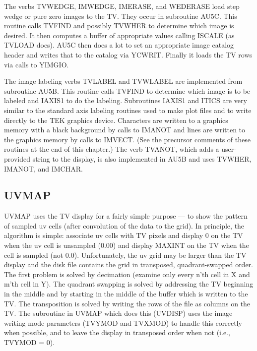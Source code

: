 The verbs TVWEDGE, IMWEDGE, IMERASE, and WEDERASE load step wedge or
pure zero images to the TV.  They occur in subroutine AU5C.  This
routine calls TVFIND and possibly TVWHER
to determine which image is
desired.  It then computes a buffer of appropriate values calling
ISCALE (as TVLOAD does).  AU5C then does a lot
to set an
appropriate image catalog header and writes that to the catalog via YCWRIT.
Finally it loads the TV rows via calls to YIMGIO.

The image labeling verbs TVLABEL and TVWLABEL are implemented from
subroutine AU5B.  This routine calls TVFIND to determine
which image is to be labeled and IAXIS1 to do the labeling.  Subroutines
IAXIS1 and ITICS are very similar to the
standard axis labeling routines
used to make plot files and to write directly to the TEK graphics
device. Characters are written to a graphics memory with a black
background by calls to IMANOT and lines are written to
the graphics memory by calls to IMVECT.  (See the precursor comments of
these routines at the end of this chapter.)  The verb TVANOT, which adds
a user-provided string to the display, is also implemented in
AU5B and uses TVWHER, IMANOT, and IMCHAR.

\subsection{UVMAP}
UVMAP uses the TV display for a fairly simple purpose --- to show the
pattern of sampled uv cells (after convolution of the data to the
grid).  In principle, the algorithm is simple: associate uv cells with
TV pixels and display 0 on the TV when the uv cell is unsampled (0.00)
and display MAXINT on the TV when the cell is sampled (not 0.0).
Unfortunately, the uv grid may be larger than the TV display and the
disk file contains the grid in transposed, quadrant-swapped order.
The first problem is solved by decimation (examine only every n'th
cell in X and m'th cell in Y).  The quadrant swapping is solved by
addressing the TV beginning in the middle and by starting in the
middle of the buffer which is written to the TV.  The transposition is
solved by writing the rows of the file as columns on the TV.  The
subroutine in UVMAP which does this (UVDISP) uses the image writing
mode parameters (TVYMOD and TVXMOD) to handle this correctly when
possible, and to leave the display in transposed order when not (i.e.,
TVYMOD = 0).

